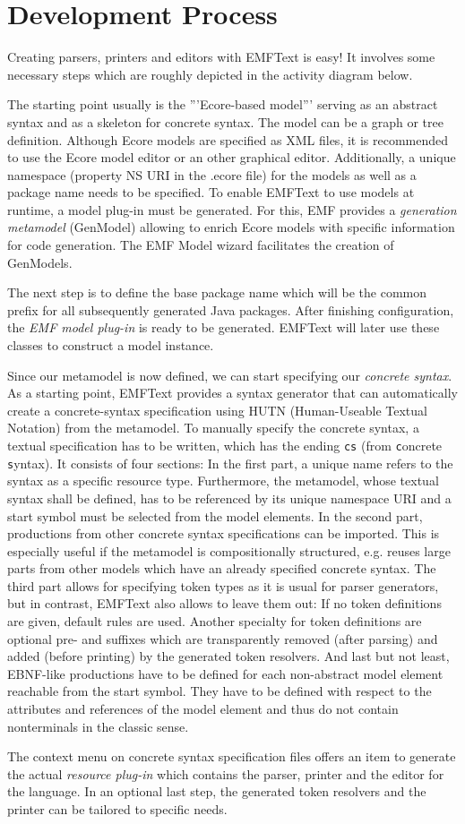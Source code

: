 \chapter{Development Process}

Creating parsers, printers and editors with EMFText is easy! It involves some
necessary steps which are roughly depicted in the activity diagram below.


The starting point usually is the '''Ecore-based model''' serving as an abstract 
syntax and as a skeleton for concrete syntax. The model can be a graph or tree 
definition. Although Ecore models are specified as XML files, it is recommended 
to use the Ecore model editor or an other graphical editor. Additionally, a unique 
namespace (property NS URI in the .ecore file) for the models as well as a package 
name needs to be specified. To enable EMFText to use models at runtime, a model 
plug-in must be generated. For this, EMF provides a \emph{generation
metamodel} (GenModel) allowing to enrich Ecore models with specific information
for code generation. The EMF Model wizard facilitates the creation of GenModels.

The next step is to define the base package name which will be the common prefix 
for all subsequently generated Java packages. After finishing configuration, the 
\emph{EMF model plug-in} is ready to be generated. EMFText will later use
these classes to construct a model instance.

Since our metamodel is now defined, we can start specifying our \emph{concrete
syntax}. As a starting point, EMFText provides a syntax generator that can
automatically create a concrete-syntax specification using HUTN (Human-Useable Textual Notation) from the 
metamodel. To manually specify the concrete syntax, a textual specification has to 
be written, which has the ending \texttt{cs} (from \texttt{c}oncrete
\texttt{s}yntax). It consists of four sections: In the first part, a unique
name refers to the syntax as a specific resource type. Furthermore, the metamodel, whose textual syntax shall be defined, has 
to be referenced by its  unique namespace URI and a start symbol must be selected from 
the model elements. In the second part, productions from other concrete syntax 
specifications can be imported. This is especially useful if the metamodel is 
compositionally structured, e.g. reuses large parts from other models which have an 
already specified concrete syntax.  The third part allows for specifying token types as
 it is usual for parser generators, but in contrast, EMFText also allows to leave them 
 out: If no token definitions are given, default rules are used. Another specialty for 
 token definitions are optional pre- and suffixes which are transparently removed (after 
 parsing) and added (before printing)  by the generated token resolvers. And last but 
 not least, EBNF-like productions have to be defined for each non-abstract model element 
 reachable from the start symbol. They have to be defined with respect to the attributes 
 and references of the model element and thus do not contain nonterminals in the classic 
 sense.

The context menu on concrete syntax specification files offers an item to generate the 
actual \emph{resource plug-in} which contains the parser, printer and the
editor for the language. In an optional last step, the generated token resolvers and the printer can be 
tailored to specific needs.
